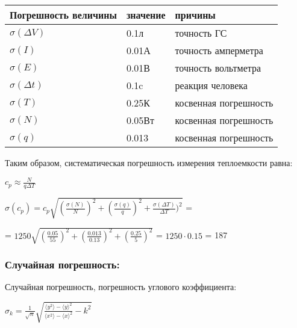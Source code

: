 \documentclass[a4paper,17pt]{article}
\begin{document}
                        \begin{center}
                \begin{tabular}{ | l | l | l |}
                    \hline
                    Погрешность величины& значение  &   причины                 \\ \hline
                    $\sigma (\Delta V)$ &   0.1л    &   точность ГС             \\
                    $\sigma (I)$        &   0.01А   &   точность амперметра     \\
                    $\sigma (E)$        &   0.01В   &   точность вольтметра     \\
                    $\sigma (\Delta t)$ &   0.1c    &   реакция человека        \\
                    $\sigma (T)$        &   0.25К   &   косвенная погрешность   \\
                    $\sigma (N)$        &   0.05Вт  &   косвенная погрешность   \\
                    $\sigma (q)$        &   0.013   &   косвенная погрешность   \\
                    \hline
                \end{tabular}   
            \end{center}
            
            Таким образом, систематическая погрешность измерения теплоемкости равна:
            
            \begin{center}
                $c_p \approx \frac{N}{q \Delta T}$
            
                $\sigma(c_p) = c_p\sqrt{(\frac{\sigma(N)}{N})^2 + (\frac{\sigma(q)}{q})^2 + \frac{\sigma(\Delta T)}{\Delta T})^2}$ =
                
                = $1250\sqrt{(\frac{0.05}{55})^2 + (\frac{0.013}{0.13})^2 + (\frac{0.25}{5})^2}$ = $1250 \cdot 0.15$ = 187 
            \end{center}
            
        \subsubsection{Случайная погрешность:}
        
            Случайная погрешность, погрешность углового коэффициента:
    
            \begin{center}
                $\sigma_{k} = \frac{1}{\sqrt{n}}\sqrt{\frac{\langle y^2 \rangle - \langle y \rangle ^2}{\langle x^2 \rangle - \langle x \rangle ^2} - k^2}$
            \end{center}
            
\end{document}
